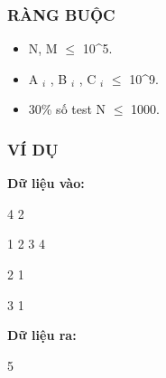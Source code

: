 \subsubsection{   RÀNG BUỘC  }
\begin{itemize}
	\item     N, M  $\le$  10\textasciicircum5.   
	\item     A    $_     i    $    , B    $_     i    $    , C    $_     i    $     $\le$  10\textasciicircum9.   
	\item     30\% số test N  $\le$  1000.   
\end{itemize}

\subsubsection{   VÍ DỤ  }

\textbf{    Dữ liệu vào:   }

   4 2  

   1 2 3 4  

   2 1  

   3 1  

\textbf{    Dữ liệu ra:   }

   5  
